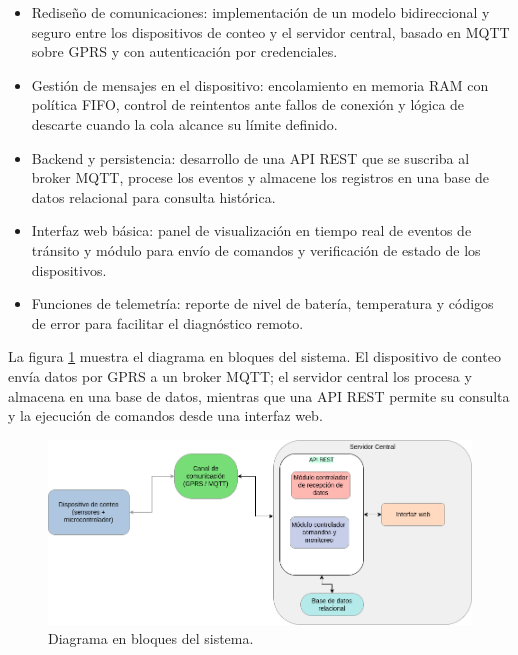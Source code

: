\begin{itemize}

\item Rediseño de comunicaciones: implementación de un modelo bidireccional y seguro entre los dispositivos de conteo y el servidor central, basado en MQTT sobre GPRS y con autenticación por credenciales.

\item Gestión de mensajes en el dispositivo: encolamiento en memoria RAM con política FIFO, control de reintentos ante fallos de conexión y lógica de descarte cuando la cola alcance su límite definido.

\item Backend y persistencia: desarrollo de una API REST que se suscriba al broker MQTT, procese los eventos y almacene los registros en una base de datos relacional para consulta histórica.

\item Interfaz web básica: panel de visualización en tiempo real de eventos de tránsito y módulo para envío de comandos y verificación de estado de los dispositivos.

\item Funciones de telemetría: reporte de nivel de batería, temperatura y códigos de error para facilitar el diagnóstico remoto.

\end{itemize}

La figura \ref{fig:diag_bloques} muestra el diagrama en bloques del sistema. 
El dispositivo de conteo envía datos por GPRS a un broker MQTT; el servidor central 
los procesa y almacena en una base de datos, mientras que una API REST permite su 
consulta y la ejecución de comandos desde una interfaz web.

\vspace{1cm}

\begin{figure}[htbp]
  \centering
  \includegraphics[width=\linewidth]{./Figures/diagBloques.png}
  \caption{Diagrama en bloques del sistema.}
  \label{fig:diag_bloques}
\end{figure}

\vspace{1cm}











